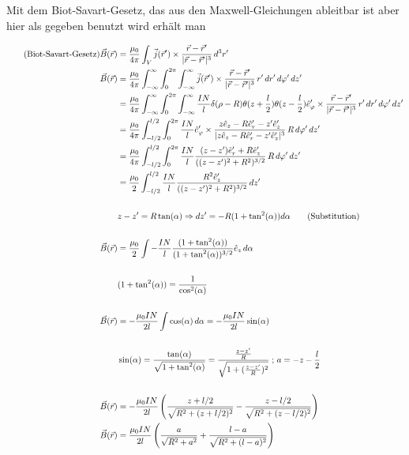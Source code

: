 \documentclass{article}
\begin{document}
Mit dem {\sc Biot-Savart-Gesetz}, das aus den {\sc Maxwell-Gleichungen} ableitbar ist aber hier als gegeben benutzt wird erhält man


\begin{align}
\tag{Biot-Savart-Gesetz}
\vec{B}(\vec{r}) &=           \frac{\mu_0}{4\pi}\int_V \vec{j}(\vec{r}') \times
\frac{\vec{r}-\vec{r}'}{|\vec{r}-\vec{r}'|^3} \, d^3r'
\\
\vec{B}(\vec{r}) &= \frac{\mu_0}{4\pi}\int_{-\infty}^\infty \int_0^{2\pi} \int_{-\infty}^\infty
\vec{j}(\vec{r}') \times \frac{\vec{r}-\vec{r}'}{|\vec{r}-\vec{r}'|^3} 
\, r' \, dr' \, d\varphi' \, dz'
\notag
\\
&= \frac{\mu_0}{4\pi}\int_{-\infty}^\infty \int_0^{2\pi} \int_{-\infty}^\infty
\frac{IN}{l}\delta(\rho - R) \theta(z+\frac{l}{2}) \theta(z-\frac{l}{2}) \hat{e}_\varphi' \times
\frac{\vec{r}-\vec{r}'}{|\vec{r}-\vec{r}'|^3}  \, r' \, dr' \, d\varphi' \, dz'
\notag
\\
&= \frac{\mu_0}{4\pi}\int_{-l/2}^{l/2} \int_0^{2\pi} \frac{IN}{l} \hat{e}_\varphi'
\times \frac{z\hat{e}_z-R\hat{e}_r'-z'\hat{e}_z'}{|z\hat{e}_z-R\hat{e}_r'-z'\hat{e}_z'|^3} \, R \, d\varphi' \, dz'
\notag
\\
&= \frac{\mu_0}{4\pi}\int_{-l/2}^{l/2} \int_0^{2\pi} \frac{IN}{l}
\frac{(z-z')\hat{e}_r'+R\hat{e}_z'}{((z-z')^2+R^2)^{3/2}} \, R \, d\varphi' \, dz'
\notag
\\
 &= \frac{\mu_0}{2}\int_{-l/2}^{l/2} \frac{IN}{l}
\frac{R^2\hat{e}_z'}{((z-z')^2+R^2)^{3/2}} \, dz'
\notag
\\
\notag
\\
&z-z' = R \tan (\alpha) \Rightarrow dz' = -R(1 + \tan^2(\alpha)) d \alpha
\tag{Substitution}
\\
\notag
\\
\vec{B}(\vec{r}) &= \frac{\mu_0}{2}\int -\frac{IN}{l}
\frac{(1+\tan^2(\alpha))}{(1+\tan^2(\alpha))^{3/2}}\hat{e}_z \, d \alpha
\notag
\\
\notag
\\
&(1 + \tan^2(\alpha)) = \frac{1}{\cos^2(\alpha)}
\notag
\\
\notag
\\
\vec{B}(\vec{r}) &= -\frac{\mu_0 I N}{2 l}\int
\cos (\alpha) \, d \alpha
=  -\frac{\mu_0 I N}{2 l} \sin (\alpha)
\notag
\\
\notag
\\
& \sin (\alpha) = \frac{\tan (\alpha)}{\sqrt{1+\tan^2 (\alpha)}}
= \frac{\frac{z-z'}{R}}{\sqrt{1+(\frac{z-z'}{R})^2}} \; ; \, a =  - z -\frac{l}{2}
\notag
\\
\notag
\\
\vec{B}(\vec{r}) &= -\frac{\mu_0 I N}{2 l} \left(\frac{z+l/2}{\sqrt{R^2+(z+l/2)^2}}-\frac{z-l/2}
{\sqrt{R^2+(z-l/2)^2}}\right)
\notag
\\
\vec{B}(\vec{r}) &= \frac{\mu_0 I N}{2 l} 
\left(\frac{a}{\sqrt{R^2+a^2}}+\frac{l-a}{\sqrt{R^2+(l-a)^2}}\right)
\label{magnetfeld}
\end{align}
\newpage
\end{document}
